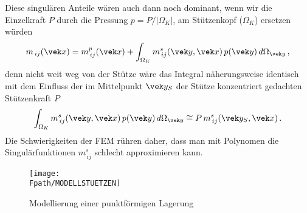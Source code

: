 {Diese singul\"{a}ren Anteile w\"{a}ren auch dann noch dominant, wenn wir die Einzelkraft $P$
durch die Pressung $p = P/|\Omega_K|$, am St\"{u}tzenkopf ($\Omega_K$) ersetzen
w\"{u}rden
\begin{align}
m_{\,ij}(\vek x) = m_{\,ij}^{p}(\vek x) + \int_{\Omega_K} m_{\,ij}^{s}(\vek y,\vek
x)\,p(\vek y) \,d\Omega_{\vek y}\,,
\end{align}
denn nicht weit weg von der St\"{u}tze w\"{a}re das Integral n\"{a}herungsweise identisch mit dem
Einfluss der im Mittelpunkt $\vek y_S$ der St\"{u}tze konzentriert gedachten St\"{u}tzenkraft $P$
\begin{align}
\int_{\Omega_K} m_{\,ij}^{s}(\vek y,\vek x)\,p(\vek y) \,d\Omega_{\vek y} \cong P
\,m_{\,ij}^{s}(\vek y_S,\vek x)\,.
\end{align}
Die Schwierigkeiten der FEM r\"{u}hren daher, dass man mit Polynomen die Singul\"{a}rfunktionen
$m_{\,ij}^{s}$ schlecht approximieren kann.


\begin{figure}[tbp]
\if {} \sidecaption \fi
\texttt{[image: \\Fpath/MODELLSTUETZEN]}
\caption{Modellierung einer punktf\"{o}rmigen Lagerung}\label{Modellstuetzen}
\end{figure}%

}
